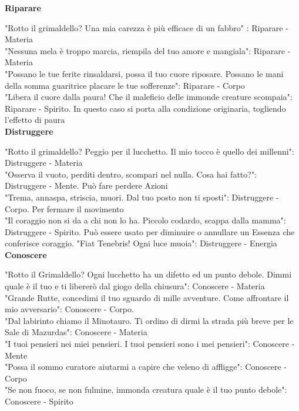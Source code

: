 \documentclass[a4paper,twoside,openany]{book}
\begin{document}
\textbf{Riparare}

"Rotto il grimaldello? Una mia carezza è più efficace di un fabbro" : Riparare - Materia\\
"Nessuna mela è troppo marcia, riempila del tuo amore e mangiala": Riparare - Materia\\
"Possano le tue ferite rinsaldarsi, possa il tuo cuore riposare. Possano le mani della somma guaritrice placare le tue sofferenze": Riparare - Corpo\\
"Libera il cuore dalla paura! Che il maleficio delle immonde creature scompaia": Riparare - Spirito. In questo caso si porta alla condizione originaria, togliendo l'effetto di paura\\

\textbf{Distruggere}

"Rotto il grimaldello? Peggio per il lucchetto. Il mio tocco è quello dei millenni": Distruggere - Materia\\
"Osserva il vuoto, perditi dentro, scompari nel nulla. Cosa hai fatto?": Distruggere - Mente. Può fare perdere Azioni\\
"Trema, annaspa, striscia, muori. Dal tuo posto non ti sposti": Distruggere - Corpo. Per fermare il movimento\\
"Il coraggio non si da a chi non lo ha. Piccolo codardo, scappa dalla mamma": Distruggere - Spirito. Può essere usato per diminuire o annullare un Essenza che conferisce coraggio.
"Fiat Tenebris! Ogni luce muoia": Distruggere - Energia\\

\textbf{Conoscere}

"Rotto il Grimaldello? Ogni lucchetto ha un difetto ed un punto debole. Dimmi quale è il tuo e ti libererò dal giogo della chiusura": Conoscere - Materia\\
"Grande Rutte, concedimi il tuo sguardo di mille avventure. Come affrontare il mio avversario": Conoscere - Corpo.\\
"Dal labirinto chiamo il Minotauro. Ti ordino di dirmi la strada più breve per le Sale di Mazurdas": Conoscere - Materia\\
"I tuoi pensieri nei miei pensieri. I tuoi pensieri sono i mei pensieri": Conoscere - Mente\\
"Possa il sommo curatore aiutarmi a capire che veleno di affligge": Conoscere - Corpo\\
"Se non fuoco, se non fulmine, immonda creatura quale è il tuo punto debole": Conoscere - Spirito\\



\pagebreak

\begin{multicols}{2}
	{\small \tableofcontents{}}
\end{multicols}

\pagebreak{}
\end{document}
